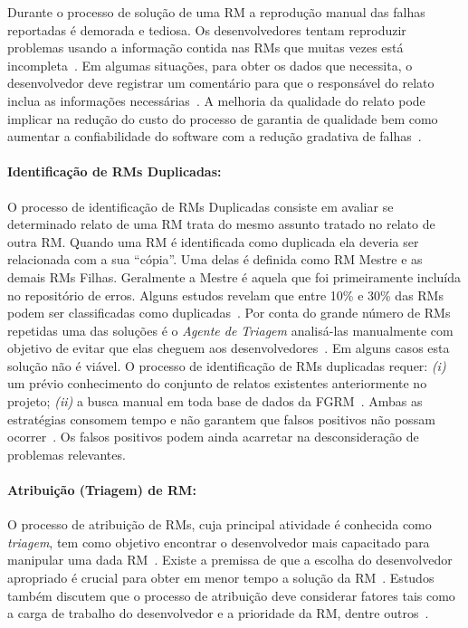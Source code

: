 Durante o processo de solução de uma RM a reprodução manual das falhas
reportadas é demorada e tediosa. Os desenvolvedores tentam reproduzir problemas
usando a informação contida nas RMs que muitas vezes está
incompleta~\cite{White:2015:GRR:2820282.2820291}. Em algumas situações, para
obter os dados que necessita, o desenvolvedor deve registrar um comentário para
que o responsável do relato inclua as informações necessárias~\cite{5070993}. A
melhoria da qualidade do relato pode implicar na redução do custo do processo de
garantia de qualidade bem como aumentar a confiabilidade do software com a
redução gradativa de falhas~\cite{Tu:2014:MQI:2677832.2677844}.

\paragraph{Identificação de RMs Duplicadas:}

O processo de identificação de RMs Duplicadas consiste em avaliar se determinado
relato de uma RM trata do mesmo assunto tratado no relato de outra RM\@. Quando
uma RM é identificada como duplicada ela deveria ser relacionada com a sua
``cópia''. Uma delas é definida como RM Mestre e as demais RMs Filhas.
Geralmente a Mestre é aquela que foi primeiramente incluída no repositório de
erros. Alguns estudos revelam que entre 10\% e 30\% das RMs podem ser
classificadas como
duplicadas~\cite{anvik2005coping,cavalcanti2013bug,Runeson:2007:DDD:1248820.1248882}.
Por conta do grande número de RMs repetidas uma das soluções é o \textit{Agente
    de Triagem} analisá-las manualmente com objetivo de evitar que elas cheguem
aos desenvolvedores~\cite{anvik2005coping}. Em alguns casos esta solução não é
viável. O processo de identificação de RMs duplicadas requer: \textit{(i)} um
prévio conhecimento do conjunto de relatos existentes anteriormente no projeto;
\textit{(ii)} a busca manual em toda base de dados da
FGRM~\cite{banerjee2012automated,
    Lerch:2013:FDY:2495256.2495763,hindle2016contextual}. Ambas as estratégias
consomem tempo e não garantem que falsos positivos não possam
ocorrer~\cite{kaushik2012comparative}. Os falsos positivos podem ainda acarretar
na desconsideração de problemas relevantes.

\paragraph{Atribuição (Triagem) de RM:}

O processo de atribuição de RMs, cuja principal atividade é conhecida como
\textit{triagem}, tem como objetivo encontrar o desenvolvedor mais capacitado
para manipular uma dada RM~\cite{cavalcanti2014challenges}. Existe a premissa de
que a escolha do desenvolvedor apropriado é crucial para obter em menor tempo a
so\-lu\-ção da RM~\cite{di2002approach}. Estudos também discutem que o processo
de atribuição deve considerar fatores tais como a carga de trabalho do
desenvolvedor e a prioridade da RM, dentre outros~\cite{aljarah2011selecting}.

